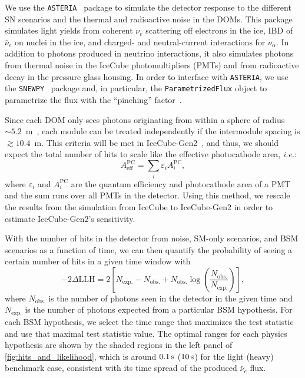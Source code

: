 \documentclass[aps,twocolumn,prl,showpacs,showkeys,preprintnumbers,superscriptaddress,nobibnotes,floatfix,longbibliography,notitlepage,nofootinbib]{revtex4-2}
\begin{document}
We use the \texttt{ASTERIA}~\cite{spencer_griswold_2020_3926835} package to simulate the detector response to the different SN scenarios and the thermal and radioactive noise in the DOMs.
This package simulates light yields from coherent $\nu_{e}$ scattering off electrons in the ice, IBD of $\bar{\nu}_{e}$ on nuclei in the ice, and charged- and neutral-current interactions for $\nu_{\alpha}$. In addition to photons produced in neutrino interactions, it also simulates photons from thermal noise in the IceCube photomultipliers (PMTs) and from radioactive decay in the pressure glass housing.
In order to interface with \texttt{ASTERIA}, we use the \texttt{SNEWPY}~\cite{SNEWS:2021ewj} package and, in particular, the \texttt{ParametrizedFlux} object to parametrize the flux with the ``pinching'' factor~\cite{Keil:2002in,SNEWS:2021ewj}.

Since each DOM only sees photons originating from within a sphere of radius $\sim 5.2$~m~\cite{IceCube:2011cwc}, each module can be treated independently if the intermodule spacing is $\gtrsim10.4$~m.
This criteria will be met in IceCube-Gen2~\cite{IceCube-Gen2:2020qha}, and thus, we should expect the total number of hits to scale like the effective photocathode area, \textit{i.e.}:
$$
A_{\mathrm{eff}}^{\mathrm{PC}} = \sum_{i} \varepsilon_{i} A_{i}^{\mathrm{PC}},
$$
where $\varepsilon_{i}$ and $A_{i}^{\mathrm{PC}}$ are the quantum efficiency and photocathode area of a PMT and the sum runs over all PMTs in the detector.
Using this method, we rescale the results from the simulation from IceCube to IceCube-Gen2 in order to estimate IceCube-Gen2's sensitivity.

With the number of hits in the detector from noise, SM-only scenarios, and BSM scenarios as a function of time, we can then quantify the probability of seeing a certain number of hits in a given time window with
\begin{equation}
\label{eq:likelihood}
    -2\Delta\mathrm{LLH} = 2 \left[N_{\mathrm{exp.}} - N_{\mathrm{obs.}} + N_{\mathrm{obs.}}\log\left(\frac{N_{\mathrm{obs.}}}{N_{\mathrm{exp.}}}\right)\right],
\end{equation}
where $N_{\mathrm{obs.}}$ is the number of photons seen in the detector in the given time and $N_{\mathrm{exp.}}$ is the number of photons expected from a particular BSM hypothesis. 
For each BSM hypothesis, we select the time range that maximizes the test statistic and use that maximal test statistic value.
The optimal ranges for each physics hypothesis are shown by the shaded regions in the left panel of \cref{fig:hits_and_likelihood}, which is around $\unit[0.1]{s}$ ($\unit[10]{s}$) for the light (heavy) benchmark case, consistent with its time spread of the produced $\bar{\nu}_e$ flux.
\end{document}
